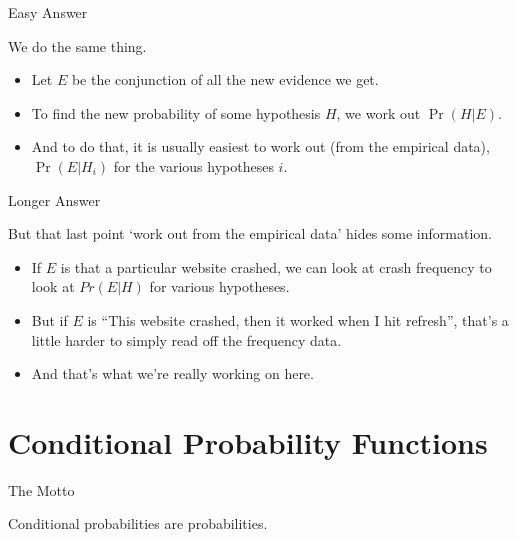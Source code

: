 \documentclass[
  ignorenonframetext,
]{beamer}
\providecommand{\tightlist}{%
  \setlength{\itemsep}{0pt}\setlength{\parskip}{0pt}}
\renewcommand{\,}{\text{, }}
\renewenvironment*{quote}	
	{\list{}{\rightmargin   \leftmargin} \item } 	
	{\endlist }
\begin{document}
\begin{frame}{Easy Answer}
\protect\hypertarget{easy-answer}{}

We do the same thing. \pause

\begin{itemize}
\tightlist
\item
  Let \(E\) be the conjunction of all the new evidence we get.
\item
  To find the new probability of some hypothesis \(H\), we work out
  \(\Pr(H | E)\).
\item
  And to do that, it is usually easiest to work out (from the empirical
  data), \(\Pr(E | H_i)\) for the various hypotheses \(i\).
\end{itemize}

\end{frame}

\begin{frame}{Longer Answer}
\protect\hypertarget{longer-answer}{}

But that last point `work out from the empirical data' hides some
information.

\begin{itemize}
\tightlist
\item
  If \(E\) is that a particular website crashed, we can look at crash
  frequency to look at \(Pr(E | H)\) for various hypotheses.
\item
  But if \(E\) is ``This website crashed, then it worked when I hit
  refresh'', that's a little harder to simply read off the frequency
  data.
\item
  And that's what we're really working on here.
\end{itemize}

\end{frame}

\hypertarget{conditional-probability-functions}{%
\section{Conditional Probability
Functions}\label{conditional-probability-functions}}

\begin{frame}{The Motto}
\protect\hypertarget{the-motto}{}

\begin{quote}
Conditional probabilities are probabilities.
\end{quote}

\end{frame}
\end{document}
